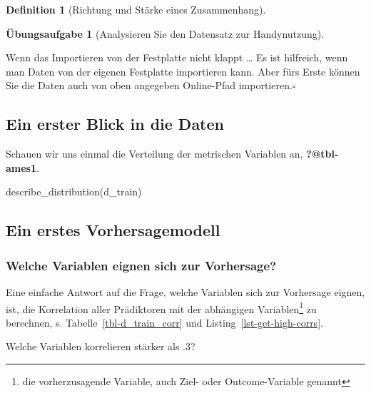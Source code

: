 \documentclass[
  a4paper,
  DIV=11]{scrreprt}
\newenvironment{Shaded}{\begin{snugshade}}{\end{snugshade}}
\newcommand{\FunctionTok}[1]{\textcolor[rgb]{0.28,0.35,0.67}{#1}}
\newcommand{\NormalTok}[1]{\textcolor[rgb]{0.00,0.23,0.31}{#1}}
\theoremstyle{definition}
\newtheorem{exercise}{Übungsaufgabe}[chapter]
\theoremstyle{definition}
\theoremstyle{definition}
\newtheorem{definition}{Definition}[chapter]
\theoremstyle{remark}
\begin{document}
\begin{definition}[Richtung und Stärke eines
Zusammenhang]
\begin{exercise}[Analysieren Sie den Datensatz zur
Handynutzung]
\begin{tcolorbox}
Wenn das Importieren von der Festplatte nicht klappt \ldots{} Es ist
hilfreich, wenn man Daten von der eigenen Festplatte importieren kann.
Aber fürs Erste können Sie die Daten auch von oben angegeben Online-Pfad
importieren.\(\square\)

\end{tcolorbox}

\subsection{Ein erster Blick in die
Daten}\label{ein-erster-blick-in-die-daten}

Schauen wir uns einmal die Verteilung der metrischen Variablen an,
\textbf{?@tbl-ames1}.

\begin{Shaded}
\begin{Highlighting}[]
\FunctionTok{describe\_distribution}\NormalTok{(d\_train)}
\end{Highlighting}
\end{Shaded}

\subsection{Ein erstes
Vorhersagemodell}\label{ein-erstes-vorhersagemodell}

\subsubsection{Welche Variablen eignen sich zur
Vorhersage?}\label{welche-variablen-eignen-sich-zur-vorhersage}

Eine einfache Antwort auf die Frage, welche Variablen sich zur
Vorhersage eignen, ist, die Korrelation aller Prädiktoren mit der
abhängigen Variablen\footnote{die vorherzusagende Variable, auch Ziel-
  oder Outcome-Variable genannt} zu berechnen, s.
Tabelle~\ref{tbl-d_train_corr} und Listing~\ref{lst-get-high-corrs}.

\begin{codelisting}

\caption{\label{lst-get-high-corrs}Welche Variablen korrelieren stärker
als .3?}

\centering{

}
\end{codelisting}
\end{exercise}
\end{definition}
\end{document}

